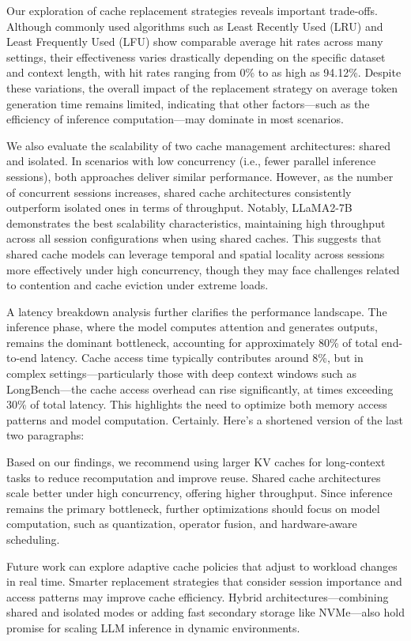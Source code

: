 \documentclass[sigconf,nonacm]{acmart}
\begin{document}
Our exploration of cache replacement strategies reveals important trade-offs. Although commonly used algorithms such as Least Recently Used (LRU) and Least Frequently Used (LFU) show comparable average hit rates across many settings, their effectiveness varies drastically depending on the specific dataset and context length, with hit rates ranging from 0\% to as high as 94.12\%. Despite these variations, the overall impact of the replacement strategy on average token generation time remains limited, indicating that other factors—such as the efficiency of inference computation—may dominate in most scenarios.

We also evaluate the scalability of two cache management architectures: shared and isolated. In scenarios with low concurrency (i.e., fewer parallel inference sessions), both approaches deliver similar performance. However, as the number of concurrent sessions increases, shared cache architectures consistently outperform isolated ones in terms of throughput. Notably, LLaMA2-7B demonstrates the best scalability characteristics, maintaining high throughput across all session configurations when using shared caches. This suggests that shared cache models can leverage temporal and spatial locality across sessions more effectively under high concurrency, though they may face challenges related to contention and cache eviction under extreme loads.

A latency breakdown analysis further clarifies the performance landscape. The inference phase, where the model computes attention and generates outputs, remains the dominant bottleneck, accounting for approximately 80\% of total end-to-end latency. Cache access time typically contributes around 8\%, but in complex settings—particularly those with deep context windows such as LongBench—the cache access overhead can rise significantly, at times exceeding 30\% of total latency. This highlights the need to optimize both memory access patterns and model computation.
Certainly. Here’s a shortened version of the last two paragraphs:

Based on our findings, we recommend using larger KV caches for long-context tasks to reduce recomputation and improve reuse. Shared cache architectures scale better under high concurrency, offering higher throughput. Since inference remains the primary bottleneck, further optimizations should focus on model computation, such as quantization, operator fusion, and hardware-aware scheduling.

Future work can explore adaptive cache policies that adjust to workload changes in real time. Smarter replacement strategies that consider session importance and access patterns may improve cache efficiency. Hybrid architectures—combining shared and isolated modes or adding fast secondary storage like NVMe—also hold promise for scaling LLM inference in dynamic environments.
\end{document}
